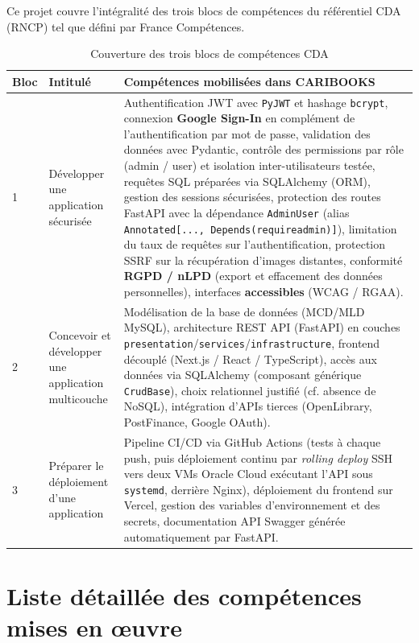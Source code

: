 \documentclass[12pt, a4paper]{report}
\renewcommand{\_}{\origunderscore\allowbreak}
\begin{document}
Ce projet couvre l'intégralité des trois blocs de compétences du référentiel CDA (RNCP) tel que défini par France Compétences.

\begin{table}[h]
\centering
\renewcommand{\arraystretch}{1.5}
\begin{tabular}{@{}p{1cm}p{5cm}p{8cm}@{}}
\toprule
\textbf{Bloc} & \textbf{Intitulé} & \textbf{Compétences mobilisées dans CARIBOOKS} \\
\midrule
1 & Développer une application sécurisée &
  Authentification JWT avec \texttt{PyJWT} et hashage \texttt{bcrypt}, connexion \textbf{Google Sign-In} en complément de l'authentification par mot de passe, validation des données avec Pydantic, contrôle des permissions par rôle (admin / user) et isolation inter-utilisateurs testée, requêtes SQL préparées via SQLAlchemy (ORM), gestion des sessions sécurisées, protection des routes FastAPI avec la dépendance \texttt{AdminUser} (alias \texttt{Annotated[..., Depends(require\_admin)]}), limitation du taux de requêtes sur l'authentification, protection SSRF sur la récupération d'images distantes, conformité \textbf{RGPD / nLPD} (export et effacement des données personnelles), interfaces \textbf{accessibles} (WCAG / RGAA). \\
\midrule
2 & Concevoir et développer une application multicouche &
  Modélisation de la base de données (MCD/MLD MySQL), architecture REST API (FastAPI) en couches \texttt{presentation}/\texttt{services}/\texttt{infrastructure}, frontend découplé (Next.js / React / TypeScript), accès aux données via SQLAlchemy (composant générique \texttt{CrudBase}), choix relationnel justifié (cf. absence de NoSQL), intégration d'APIs tierces (OpenLibrary, PostFinance, Google OAuth). \\
\midrule
3 & Préparer le déploiement d'une application &
  Pipeline CI/CD via GitHub Actions (tests à chaque push, puis déploiement continu par \textit{rolling deploy} SSH vers deux VMs Oracle Cloud exécutant l'API sous \texttt{systemd}, derrière Nginx), déploiement du frontend sur Vercel, gestion des variables d'environnement et des secrets, documentation API Swagger générée automatiquement par FastAPI. \\
\bottomrule
\end{tabular}
\caption{Couverture des trois blocs de compétences CDA}
\label{tab:blocs_cda}
\end{table}

\section{Liste détaillée des compétences mises en \oe{}uvre}
\end{document}
